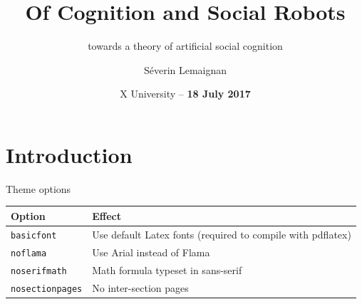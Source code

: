 \documentclass[compress]{beamer}
\title{Of Cognition and Social Robots}
\subtitle{towards a theory of artificial social cognition}
\date{X University -- {\bf 18 July 2017}}
\author{Séverin Lemaignan}
\institute{Cenrte for Neural Systems and Robotics\\{\bf Plymouth University}}
\begin{document}

\maketitle


\section{Introduction}

\begin{frame}{Theme options}
    \begin{table}[]
        \begin{tabularx}{\linewidth}{l>{\raggedright}X}
            \toprule
            \textbf{Option}			& \textbf{Effect} \tabularnewline
            \midrule
            \texttt{basicfont}		& Use default Latex fonts (required to compile
            with pdflatex) \tabularnewline
            \texttt{noflama}		& Use Arial instead of Flama \tabularnewline
            \texttt{noserifmath}		& Math formula typeset in sans-serif \tabularnewline
            \texttt{nosectionpages} & No inter-section pages \tabularnewline
            \bottomrule
        \end{tabularx}
        \label{tab:options}
    \end{table}
\end{frame}
\end{document}
